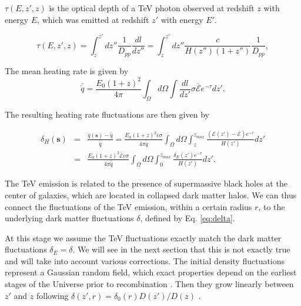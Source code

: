 \documentclass[onecolumn]{emulateapj}
\begin{document}
$\tau(E,z',z)$ is the optical depth of a TeV photon observed at redshift $z$ with energy $E$, which was emitted at redshift $z'$ with energy $E'$.

\begin{equation}
  \label{eq:tau}
  \tau(E,z',z)=\int_z^{z'}dz''\frac{1}{D_{pp}}\frac{dl}{dz''}=\int_z^{z'}dz''\frac{c}{H(z'')(1+z'')}\frac{1}{D_{pp}},
\end{equation}



The mean heating rate is given by 
\begin{equation}
  \label{eq:mean_exp_heat}
  \bar{\dot{q}}=\frac{E_0(1+z)^2}{4\pi}\int_{\Omega}d\Omega\int \frac{dl}{dz'}\sigma\bar{\mathcal{E}} e^{-\tau}dz'.
\end{equation}

The resulting heating rate fluctuations are then given by

\begin{eqnarray}
  \label{eq:fluc_exp0}
  \delta_H(\mathbf{s})&=&\frac{\dot{q}(\mathbf{s})-\bar{\dot{q}}}{\bar{\dot{q}}}=\frac{E_0(1+z)^2c\sigma}{4\pi\bar{\dot{q}}} \int_{\Omega}d\Omega\int_z^{z_{max}} \frac{ ( \mathcal{E}(z')-\bar{\mathcal{E}})  e^{-\tau}}{H(z')} dz' \\ \nonumber
  &=&\frac{E_0(1+z)^2\bar{\mathcal{E}} c\sigma}{4\pi\bar{\dot{q}}}  \int_{\Omega}d\Omega\int_0^{z_{max}}   \frac{\delta_E(z')  e^{-\tau}}{H(z')}dz'.
\end{eqnarray}

The TeV emission is related to the presence of supermassive black holes at the center of galaxies, which are located in collapsed dark matter halos.  We can thus connect the fluctuations of the TeV emission, within a certain radius $r$, to the underlying dark matter fluctuations $\delta$, defined by Eq. \ref{eq:delta}.


At this stage we assume the TeV fluctuations exactly match the dark matter fluctuations $\delta_E=\delta$.  We will see in the next section that this is not exactly true and will take into account various corrections.  The initial density fluctuations represent a Gaussian random field, which exact properties depend on the earliest stages of the Universe prior to recombination \citep{1986ApJ...304...15B,Peebles}. Then they grow linearly between $z'$ and $z$ following $\delta(z',r)=\delta_0(r)D(z')/D(z)$ \citep{ 1977MNRAS.179..351H}.
\end{document}
